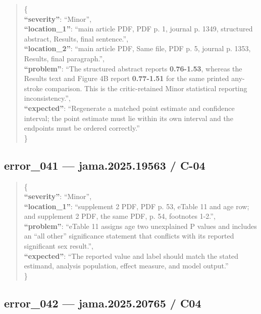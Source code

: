 \documentclass[
  letterpaper,
  9pt]{extreport}
\begin{document}
\begin{quote}
\{\\
\textbf{``severity''}: ``Minor'',\\
\textbf{``location\_1''}: ``main article PDF, PDF p. 1, journal p. 1349,
structured abstract, Results, final sentence.'',\\
\textbf{``location\_2''}: ``main article PDF, Same file, PDF p. 5,
journal p. 1353, Results, final paragraph.'',\\
\textbf{``problem''}: ``The structured abstract reports
\textbf{0.76-1.53}, whereas the Results text and Figure 4B report
\textbf{0.77-1.51} for the same printed any-stroke comparison. This is
the critic-retained Minor statistical reporting inconsistency.'',\\
\textbf{``expected''}: ``Regenerate a matched point estimate and
confidence interval; the point estimate must lie within its own interval
and the endpoints must be ordered correctly.''\\
\}
\end{quote}

\hypertarget{error_041--jama202519563--c-04}{%
\subsection{error\_041 --- jama.2025.19563 /
C-04}\label{error_041--jama202519563--c-04}}

\begin{quote}
\{\\
\textbf{``severity''}: ``Minor'',\\
\textbf{``location\_1''}: ``supplement 2 PDF, PDF p. 53, eTable 11 and
age row; and supplement 2 PDF, the same PDF, p. 54, footnotes 1-2.'',\\
\textbf{``problem''}: ``eTable 11 assigns age two unexplained P values
and includes an ``all other'' significance statement that conflicts with
its reported significant sex result.'',\\
\textbf{``expected''}: ``The reported value and label should match the
stated estimand, analysis population, effect measure, and model
output.''\\
\}
\end{quote}

\hypertarget{error_042--jama202520765--c04}{%
\subsection{error\_042 --- jama.2025.20765 /
C04}\label{error_042--jama202520765--c04}}
\end{document}
